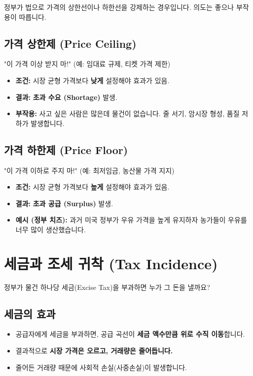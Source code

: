 \documentclass[11pt,a4paper]{book}
\begin{document}
정부가 법으로 가격의 상한선이나 하한선을 강제하는 경우입니다. 의도는 좋으나 부작용이 따릅니다.

\subsection{가격 상한제 (Price Ceiling)}
"이 가격 이상 받지 마!" (예: 임대료 규제, 티켓 가격 제한)
\begin{itemize}
    \item \textbf{조건:} 시장 균형 가격보다 \textbf{낮게} 설정해야 효과가 있음.
    \item \textbf{결과:} \textbf{초과 수요 (Shortage)} 발생.
    \item \textbf{부작용:} 사고 싶은 사람은 많은데 물건이 없습니다. 줄 서기, 암시장 형성, 품질 저하가 발생합니다.
\end{itemize}

\subsection{가격 하한제 (Price Floor)}
"이 가격 이하로 주지 마!" (예: 최저임금, 농산물 가격 지지)
\begin{itemize}
    \item \textbf{조건:} 시장 균형 가격보다 \textbf{높게} 설정해야 효과가 있음.
    \item \textbf{결과:} \textbf{초과 공급 (Surplus)} 발생.
    \item \textbf{예시 (정부 치즈):} 과거 미국 정부가 우유 가격을 높게 유지하자 농가들이 우유를 너무 많이 생산했습니다.
\end{itemize}

\section{세금과 조세 귀착 (Tax Incidence)}

정부가 물건 하나당 세금(Excise Tax)을 부과하면 누가 그 돈을 낼까요?

\subsection{세금의 효과}
\begin{itemize}
    \item 공급자에게 세금을 부과하면, 공급 곡선이 \textbf{세금 액수만큼 위로 수직 이동}합니다.
    \item 결과적으로 \textbf{시장 가격은 오르고, 거래량은 줄어듭니다.}
    \item 줄어든 거래량 때문에 사회적 손실(사중손실)이 발생합니다.
\end{itemize}
\end{document}
